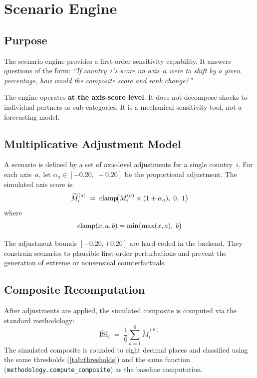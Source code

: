 \section{Scenario Engine}\label{sec:scenario-engine}

\subsection{Purpose}\label{sec:scenario:purpose}

The scenario engine provides a first-order sensitivity capability.  It
answers questions of the form: \emph{``If country~\(i\)'s score on axis~\(a\)
were to shift by a given percentage, how would the composite score and rank
change?''}

The engine operates \textbf{at the axis-score level}.  It does not decompose
shocks to individual partners or sub-categories.  It is a mechanical
sensitivity tool, not a forecasting model.

\subsection{Multiplicative Adjustment Model}\label{sec:scenario:model}

A scenario is defined by a set of axis-level adjustments for a single
country~\(i\).  For each axis~\(a\), let
\(\alpha_a \in [-0.20,\; +0.20]\) be the proportional adjustment.  The
simulated axis score is:
%
\begin{equation}\label{eq:scenario}
  \widetilde{M}_i^{(a)}
  \;=\;
  \operatorname{clamp}\!\bigl(M_i^{(a)} \times (1 + \alpha_a),\; 0,\; 1\bigr)
\end{equation}
%
where
%
\[
  \operatorname{clamp}(x, a, b) = \min\bigl(\max(x, a),\; b\bigr)
\]

The adjustment bounds \([-0.20, +0.20]\) are hard-coded in the backend.
They constrain scenarios to plausible first-order perturbations and prevent
the generation of extreme or nonsensical counterfactuals.

\subsection{Composite Recomputation}\label{sec:scenario:composite}

After adjustments are applied, the simulated composite is computed via the
standard methodology:
%
\[
  \widetilde{\mathrm{ISI}}_i
  \;=\;
  \frac{1}{6}
  \sum_{a=1}^{6} \widetilde{M}_i^{(a)}
\]
%
The simulated composite is rounded to eight decimal places and classified
using the same thresholds (\cref{tab:thresholds}) and the same function
(\texttt{methodology.compute\_composite}) as the baseline computation.

